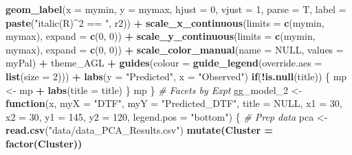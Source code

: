 \documentclass[
]{article}
\newenvironment{Shaded}{\begin{snugshade}}{\end{snugshade}}
\newcommand{\CommentTok}[1]{\textcolor[rgb]{0.56,0.35,0.01}{\textit{#1}}}
\newcommand{\ControlFlowTok}[1]{\textcolor[rgb]{0.13,0.29,0.53}{\textbf{#1}}}
\newcommand{\DataTypeTok}[1]{\textcolor[rgb]{0.13,0.29,0.53}{#1}}
\newcommand{\DecValTok}[1]{\textcolor[rgb]{0.00,0.00,0.81}{#1}}
\newcommand{\KeywordTok}[1]{\textcolor[rgb]{0.13,0.29,0.53}{\textbf{#1}}}
\newcommand{\NormalTok}[1]{#1}
\newcommand{\OperatorTok}[1]{\textcolor[rgb]{0.81,0.36,0.00}{\textbf{#1}}}
\newcommand{\OtherTok}[1]{\textcolor[rgb]{0.56,0.35,0.01}{#1}}
\newcommand{\StringTok}[1]{\textcolor[rgb]{0.31,0.60,0.02}{#1}}
\begin{document}
\begin{Shaded}
\begin{Highlighting}[]
{{{{\StringTok{    }\KeywordTok{geom_label}\NormalTok{(}\DataTypeTok{x =}\NormalTok{ mymin, }\DataTypeTok{y =}\NormalTok{ mymax, }\DataTypeTok{hjust =} \DecValTok{0}\NormalTok{, }\DataTypeTok{vjust =} \DecValTok{1}\NormalTok{, }\DataTypeTok{parse =}\NormalTok{ T,}
               \DataTypeTok{label =} \KeywordTok{paste}\NormalTok{(}\StringTok{"italic(R)^2 == "}\NormalTok{, r2)) }\OperatorTok{+}
\StringTok{    }\KeywordTok{scale_x_continuous}\NormalTok{(}\DataTypeTok{limits =} \KeywordTok{c}\NormalTok{(mymin, mymax), }\DataTypeTok{expand =} \KeywordTok{c}\NormalTok{(}\DecValTok{0}\NormalTok{, }\DecValTok{0}\NormalTok{)) }\OperatorTok{+}
\StringTok{    }\KeywordTok{scale_y_continuous}\NormalTok{(}\DataTypeTok{limits =} \KeywordTok{c}\NormalTok{(mymin, mymax), }\DataTypeTok{expand =} \KeywordTok{c}\NormalTok{(}\DecValTok{0}\NormalTok{, }\DecValTok{0}\NormalTok{)) }\OperatorTok{+}
\StringTok{    }\KeywordTok{scale_color_manual}\NormalTok{(}\DataTypeTok{name =} \OtherTok{NULL}\NormalTok{, }\DataTypeTok{values =}\NormalTok{ myPal) }\OperatorTok{+}
\StringTok{    }\NormalTok{theme_AGL }\OperatorTok{+}\StringTok{ }\KeywordTok{guides}\NormalTok{(}\DataTypeTok{colour =} \KeywordTok{guide_legend}\NormalTok{(}\DataTypeTok{override.aes =} \KeywordTok{list}\NormalTok{(}\DataTypeTok{size =} \DecValTok{2}\NormalTok{))) }\OperatorTok{+}
\StringTok{    }\KeywordTok{labs}\NormalTok{(}\DataTypeTok{y =} \StringTok{"Predicted"}\NormalTok{, }\DataTypeTok{x =} \StringTok{"Observed"}\NormalTok{)}
  \ControlFlowTok{if}\NormalTok{(}\OperatorTok{!}\KeywordTok{is.null}\NormalTok{(title)) \{ mp <-}\StringTok{ }\NormalTok{mp }\OperatorTok{+}\StringTok{ }\KeywordTok{labs}\NormalTok{(}\DataTypeTok{title =}\NormalTok{ title) \}}
\NormalTok{  mp}
\NormalTok{\}}
\CommentTok{# Facets by Expt}
\NormalTok{gg_model_}\DecValTok{2}\NormalTok{ <-}\StringTok{ }\ControlFlowTok{function}\NormalTok{(x, }\DataTypeTok{myX =} \StringTok{"DTF"}\NormalTok{, }\DataTypeTok{myY =} \StringTok{"Predicted_DTF"}\NormalTok{, }\DataTypeTok{title =} \OtherTok{NULL}\NormalTok{,}
                       \DataTypeTok{x1 =} \DecValTok{30}\NormalTok{, }\DataTypeTok{x2 =} \DecValTok{30}\NormalTok{, }\DataTypeTok{y1 =} \DecValTok{145}\NormalTok{, }\DataTypeTok{y2 =} \DecValTok{120}\NormalTok{, }\DataTypeTok{legend.pos =} \StringTok{"bottom"}\NormalTok{) \{}
  \CommentTok{# Prep data}
\NormalTok{  pca <-}\StringTok{ }\KeywordTok{read.csv}\NormalTok{(}\StringTok{"data/data_PCA_Results.csv"}\NormalTok{) }\OperatorTok{%
\StringTok{    }\KeywordTok{mutate}\NormalTok{(}\DataTypeTok{Cluster =} \KeywordTok{factor}\NormalTok{(Cluster))}
}}}}}
\end{Highlighting}
\end{Shaded}
\end{document}
